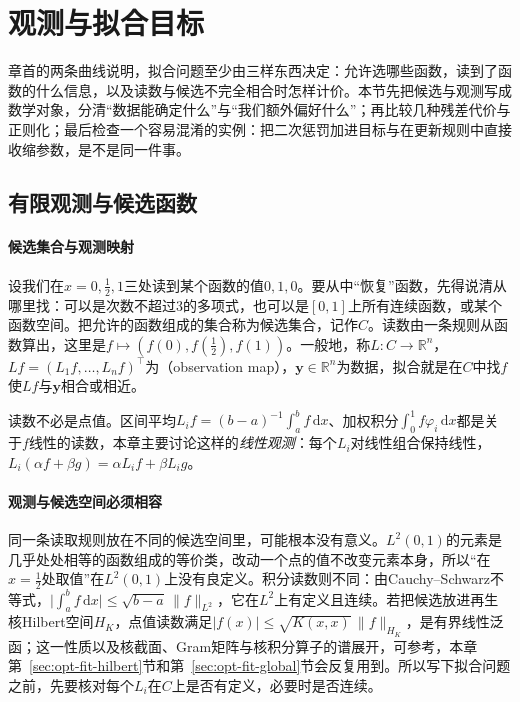 \section{观测与拟合目标}
\label{sec:opt-fit-observations}

章首的两条曲线说明，拟合问题至少由三样东西决定：允许选哪些函数，读到了函数的什么信息，以及读数与候选不完全相合时怎样计价。本节先把候选与观测写成数学对象，分清“数据能确定什么”与“我们额外偏好什么”；再比较几种残差代价与正则化；最后检查一个容易混淆的实例：把二次惩罚加进目标与在更新规则中直接收缩参数，是不是同一件事。

\subsection{有限观测与候选函数}
\label{sec:opt-fit-finite-observations}

\paragraph{候选集合与观测映射}
设我们在$x=0,\tfrac12,1$三处读到某个函数的值$0,1,0$。要从中“恢复”函数，先得说清从哪里找：可以是次数不超过$3$的多项式，也可以是$[0,1]$上所有连续函数，或某个函数空间。把允许的函数组成的集合称为候选集合，记作$C$。读数由一条规则从函数算出，这里是$f\mapsto(f(0),f(\tfrac12),f(1))$。一般地，称$L:C\to\mathbb R^n$，$Lf=(L_1f,\dots,L_nf)^\top$为（observation map），$\bm y\in\mathbb R^n$为数据，拟合就是在$C$中找$f$使$Lf$与$\bm y$相合或相近。

读数不必是点值。区间平均$L_if=(b-a)^{-1}\int_a^bf\,\mathrm dx$、加权积分$\int_0^1f\varphi_i\,\mathrm dx$都是关于$f$线性的读数，本章主要讨论这样的\emph{线性观测}：每个$L_i$对线性组合保持线性，$L_i(\alpha f+\beta g)=\alpha L_if+\beta L_ig$。

\paragraph{观测与候选空间必须相容}
同一条读取规则放在不同的候选空间里，可能根本没有意义。$L^2(0,1)$的元素是几乎处处相等的函数组成的等价类，改动一个点的值不改变元素本身，所以“在$x=\tfrac12$处取值”在$L^2(0,1)$上没有良定义。积分读数则不同：由Cauchy--Schwarz不等式，$\bigl|\int_a^bf\,\mathrm dx\bigr|\le\sqrt{b-a}\,\|f\|_{L^2}$，它在$L^2$上有定义且连续。若把候选放进再生核Hilbert空间$H_K$，点值读数满足$|f(x)|\le\sqrt{K(x,x)}\,\|f\|_{H_K}$，是有界线性泛函；这一性质以及核截面、Gram矩阵与核积分算子的谱展开，可参考，本章第~\ref{sec:opt-fit-hilbert}节和第~\ref{sec:opt-fit-global}节会反复用到。所以写下拟合问题之前，先要核对每个$L_i$在$C$上是否有定义，必要时是否连续。

